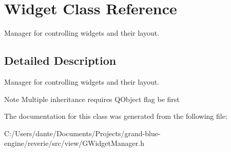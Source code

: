 \hypertarget{class_widget}{}\section{Widget Class Reference}
\label{class_widget}


Manager for controlling widgets and their layout.  




\subsection{Detailed Description}
Manager for controlling widgets and their layout. 

\begin{DoxyNote}{Note}
Multiple inheritance requires Q\+Object flag be first 
\end{DoxyNote}


The documentation for this class was generated from the following file\+:\begin{DoxyCompactItemize}
\item 
C\+:/\+Users/dante/\+Documents/\+Projects/grand-\/blue-\/engine/reverie/src/view/G\+Widget\+Manager.\+h\end{DoxyCompactItemize}
